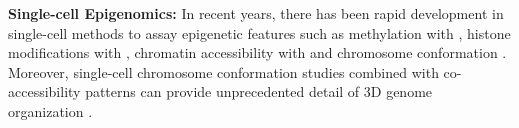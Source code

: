 \textbf{Single-cell Epigenomics: }In recent years, there has been rapid development in single-cell methods to assay epigenetic features such as  methylation with  \textbf{\cite{smallwood_single-cell_2014}}, %
 histone modifications with  \textbf{\cite{grosselin_high-throughput_2019}}, %
 chromatin accessibility with  \textbf{\cite{chen_rapid_2018,xu_plate-based_2021,buenrostro_single-cell_2015,satpathy_massively_2019}} and chromosome conformation \textbf{\cite{stevens_3d_2017,dekker_capturing_2002}}. 
 Moreover, single-cell chromosome conformation studies combined with co-accessibility patterns can provide unprecedented detail of 3D genome organization \textbf{\cite{mazan-mamczarz_single-cell_2022}}.\\


